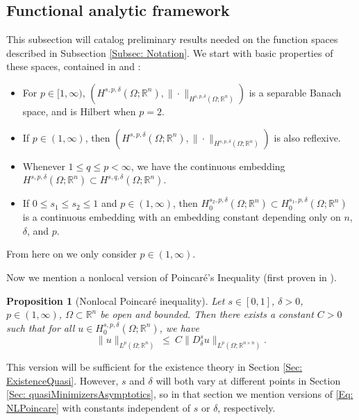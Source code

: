 \documentclass[11pt, reqno]{amsart}   	%
\theoremstyle{plain}
\numberwithin{equation}{section}
\newtheorem{proposition}[thm]{Proposition}
\def\de{\delta}
\def\Om{\Omega}
\def\R{\mathbb{R}}
\begin{document}
\subsection{Functional analytic framework}\label{Subsec: analytic}

This subsection will catalog preliminary results needed on the function spaces described in Subsection \ref{Subsec: Notation}. We start with basic properties of these spaces, contained in \cite[Propositions 2.5-2.6]{bellido2023minimizers} and \cite[Corollary 1]{cueto2023variational}:
\begin{itemize}
    \item For $p \in [1, \infty)$, $(H^{s, p, \de}(\Om; \R^n), \|\cdot\|_{H^{s, p, \de}(\Om; \R^n)})$ is a separable Banach space, and is Hilbert when $p = 2$.
		\item If $p \in (1, \infty)$, then $(H^{s, p, \de}(\Om; \R^n), \|\cdot\|_{H^{s, p, \de}(\Om; \R^n)})$ is also reflexive.
		\item Whenever $1 \leq q \leq p < \infty$, we have the continuous embedding $H^{s, p, \de}(\Om; \R^n) \subset H^{s, q, \de}(\Om; \R^n)$.
		\item If $0 \leq s_1 \leq s_2 \leq 1$ and $p \in (1, \infty)$, then $H^{s_2, p, \de}_0(\Om; \R^n) \subset H^{s_1, p, \de}_0(\Om; \R^n)$ is a continuous embedding with an embedding constant depending only on $n$, $\de$, and $p$.
\end{itemize}

From here on we only consider $p \in (1, \infty)$.

Now we mention a nonlocal version of Poincaré's Inequality (first proven in \cite[Theorem 4]{cueto2023variational}).
\begin{proposition}[Nonlocal Poincaré inequality]\label{Prop: NLPoincare}
		Let $s \in [0, 1]$,  $\delta > 0$, $p \in (1, \infty)$, $\Om \subset \R^n$ be open and bounded. Then there exists a constant $C > 0$ such that for all $u \in H^{s, p, \de}_0(\Om; \R^n)$, we have
		\begin{equation}\label{Eq: NLPoincare}
			\|u\|_{L^p(\Om; \R^n)} \ \leq \ C\|D^s_{\de}u\|_{L^p(\Om; \R^{n\times n})}.
		\end{equation}
        \end{proposition}
This version will be sufficient for the existence theory in Section \ref{Sec: ExistenceQuasi}. However, $s$ and $\de$ will both vary at different points in Section \ref{Sec: quasiMinimizersAsymptotics}, so in that section we mention versions of \eqref{Eq: NLPoincare} with constants independent of $s$ or $\de$, respectively.
\end{document}
